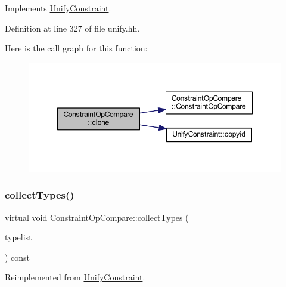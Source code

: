 Implements \mbox{\hyperlink{class_unify_constraint_a4f068343932637d355644bb21559aa12}{Unify\+Constraint}}.



Definition at line 327 of file unify.\+hh.

Here is the call graph for this function\+:
\nopagebreak
\begin{figure}[H]
\begin{center}
\leavevmode
\includegraphics[width=348pt]{class_constraint_op_compare_ae99b6c25cca1f8587d661847e474e062_cgraph}
\end{center}
\end{figure}
\mbox{\label{class_constraint_op_compare_a7cbcbc4c56d6b125f96be567421b6b94}} 
\subsubsection{\texorpdfstring{collectTypes()}{collectTypes()}}
{\footnotesize\ttfamily virtual void Constraint\+Op\+Compare\+::collect\+Types (\begin{DoxyParamCaption}\item[{vector$<$ \mbox{\hyperlink{class_unify_datatype}{Unify\+Datatype}} $>$ \&}]{typelist }\end{DoxyParamCaption}) const\hspace{0.3cm}{\ttfamily [virtual]}}



Reimplemented from \mbox{\hyperlink{class_unify_constraint_acb83b6bea3b21e13054e72ac9cfaba0f}{Unify\+Constraint}}.

\mbox{\label{class_constraint_op_compare_a24207ae4f857cc4e1d6bec892c13a04e}} 
